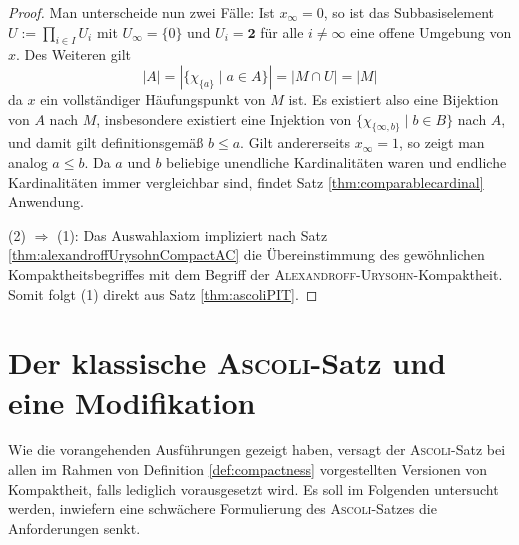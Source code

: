 \begin{proof}
  Man unterscheide nun zwei Fälle:
  Ist $x_\infty = 0$, so ist das Subbasiselement $U := \prod_{i \in I} U_i$ mit $U_\infty = \{0\}$ und $U_i = \mathbf{2}$ für alle $i \neq \infty$ eine offene Umgebung von $x$. 
  Des Weiteren gilt
  \begin{displaymath}
    |A|
    = |\{\chi_{\{a\}} \mid a \in A\}|
    = | M \cap U |
    = | M |
  \end{displaymath}
  da $x$ ein vollständiger Häufungspunkt von $M$ ist.
  Es existiert also eine Bijektion von $A$ nach $M$, insbesondere existiert eine Injektion von $\{\chi_{\{\infty,b\}} \mid b \in B\}$ nach $A$, und damit gilt definitionsgemäß $b \leq a$. 
  Gilt andererseits $x_\infty = 1$, so zeigt man analog $a \leq b$.
  Da $a$ und $b$ beliebige unendliche Kardinalitäten waren und endliche Kardinalitäten immer vergleichbar sind, findet Satz \ref{thm:comparablecardinal} Anwendung.

  (2) $\Rightarrow$ (1): Das Auswahlaxiom impliziert nach Satz \ref{thm:alexandroffUrysohnCompactAC} die Übereinstimmung des gewöhnlichen Kompaktheitsbegriffes mit dem Begriff der \textsc{Alexandroff}\hyp{}\textsc{Urysohn}\hyp{}Kompaktheit. Somit folgt (1) direkt aus Satz \ref{thm:ascoliPIT}.
\end{proof}

\section{Der klassische \textsc{Ascoli}\hyp{}Satz und eine Modifikation}

Wie die vorangehenden Ausführungen gezeigt haben, versagt der \textsc{Ascoli}\hyp{}Satz bei allen im Rahmen von Definition \ref{def:compactness} vorgestellten Versionen von Kompaktheit, falls lediglich \ZF vorausgesetzt wird. 
Es soll im Folgenden untersucht werden, inwiefern eine schwächere Formulierung des \textsc{Ascoli}\hyp{}Satzes die Anforderungen senkt.

